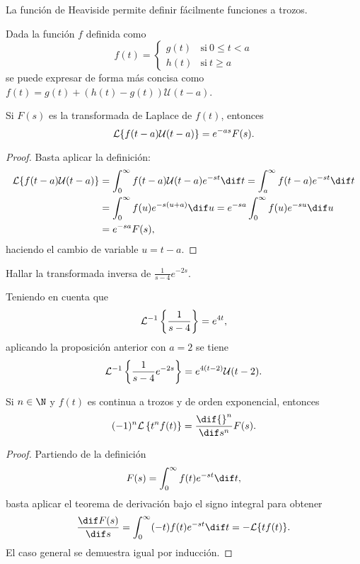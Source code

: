 \documentclass[../ecuaciones_diferenciales.tex]{subfiles}
\begin{document}
La función de Heaviside permite definir fácilmente funciones a trozos.

\begin{example}
	Dada la función \(f\) definida como
	\[f(t) =
		\begin{cases}
			g(t) & \mathrm{si}\ 0 \leq t < a \\
			h(t) & \mathrm{si}\ t \geq a
		\end{cases}
	\]
	se puede expresar de forma más concisa como
	\(f(t) = g(t) + (h(t)-g(t))\mathcal{U}(t-a)\).
\end{example}

\begin{proposition}
	Si \(F(s)\) es la transformada de Laplace de \(f(t)\), entonces
	\[\mathcal{L}\{f(t-a)\mathcal{U}(t-a)\} = e^{-as}F(s).\]
	\begin{proof}
		Basta aplicar la definición:
		\begin{align*}
			\L\{f(t-a)\mathcal{U}(t-a)\}
			 & = \int_0^\infty f(t-a)\mathcal{U}(t-a) e^{-st} \dif t
			= \int_a^\infty f(t-a)e^{-st} \dif t                     \\
			 & = \int_0^\infty f(u)e^{-s(u+a)} \dif u
			= e^{-sa} \int_0^\infty f(u) e^{-su} \dif u              \\
			 & = e^{-sa}F(s),
		\end{align*}
		haciendo el cambio de variable \(u = t - a\).
	\end{proof}
\end{proposition}

\begin{example}
	Hallar la transformada inversa de \(\frac{1}{s-4}e^{-2s}\).

	Teniendo en cuenta que
	\[\mathcal{L}^{-1}\left\{\frac{1}{s-4}\right\} = e^{4t},\]
	aplicando la proposición anterior con \(a=2\) se tiene
	\[\mathcal{L}^{-1}\left\{\frac{1}{s-4}e^{-2s}\right\} = e^{4(t-2)}\mathcal{U}(t-2).\]
\end{example}

\begin{theorem}
	Si \(n \in \N\) y \(f(t)\) es continua a trozos y de orden exponencial, entonces
	\[(-1)^n\L\left\{t^nf(t)\right\} = \frac{\dif {}^n}{\dif s^n} F(s).\]
	\begin{proof}
		Partiendo de la definición
		\[F(s) = \int_0^\infty f(t)e^{-st} \dif t,\]
		basta aplicar el teorema de derivación bajo el signo integral para obtener
		\[\frac{\dif F(s)}{\dif s} = \int_0^\infty (-t)f(t)e^{-st} \dif t =
			-\L\{tf(t)\}.\]
		El caso general se demuestra igual por inducción.
	\end{proof}
\end{theorem}
\end{document}
